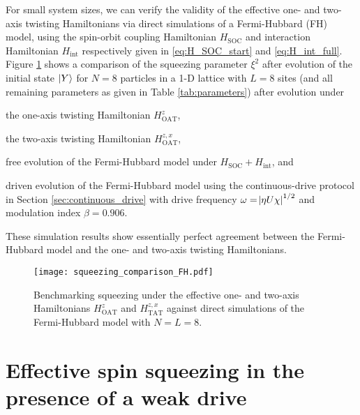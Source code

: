 \documentclass[aps,notitlepage,nofootinbib,11pt]{revtex4-1}
\renewcommand{\t}{\text} %
\newcommand{\1}{\mathds{1}}
\newcommand{\note}[1]{\textcolor{red}{#1}}
\begin{document}
For small system sizes, we can verify the validity of the effective
one- and two-axis twisting Hamiltonians via direct simulations of a
Fermi-Hubbard (FH) model, using the spin-orbit coupling Hamiltonian
$H_{\t{SOC}}$ and interaction Hamiltonian $H_{\t{int}}$ respectively
given in \eqref{eq:H_SOC_start} and \eqref{eq:H_int_full}.  Figure
\ref{fig:squeezing_comparison_FH} shows a comparison of the squeezing
parameter $\xi^2$ after evolution of the initial state $\ket{Y}$ for
$N=8$ particles in a 1-D lattice with $L=8$ sites (and all remaining
parameters as given in Table \ref{tab:parameters}) after evolution
under
\begin{enumerate*}[label=(\roman*)]
\item the one-axis twisting Hamiltonian $H_{\t{OAT}}^z$,
\item the two-axis twisting Hamiltonian $H_{\t{OAT}}^{z,x}$,
\item free evolution of the Fermi-Hubbard model under
  $H_{\t{SOC}}+H_{\t{int}}$, and
\item driven evolution of the Fermi-Hubbard model using the
  continuous-drive protocol in Section \ref{sec:continuous_drive} with
  drive frequency $\omega=\abs{\eta U\chi}^{1/2}$ and modulation index
  $\beta=0.906$.
\end{enumerate*}
These simulation results show essentially perfect agreement between
the Fermi-Hubbard model and the one- and two-axis twisting
Hamiltonians.

\begin{figure}
  \centering \texttt{[image: squeezing\_comparison\_FH.pdf]}
  \caption{Benchmarking squeezing under the effective one- and
    two-axis Hamiltonians $H_{\t{OAT}}^z$ and $H_{\t{TAT}}^{z,x}$
    against direct simulations of the Fermi-Hubbard model with
    $N=L=8$.}
  \label{fig:squeezing_comparison_FH}
\end{figure}



\newpage
\appendix

\section{Effective spin squeezing in the presence of a weak drive}
\label{sec:squeezing_derivation}
\end{document}
